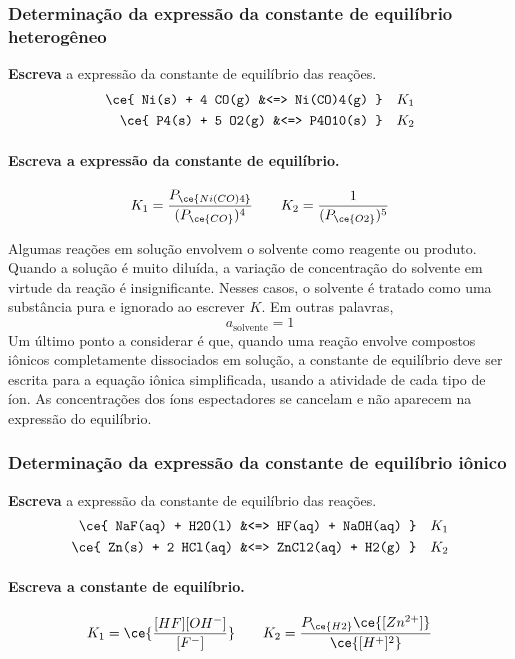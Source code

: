 \begin{example}

\subsubsection{Determinação da expressão da constante de equilíbrio heterogêneo}

\textbf{Escreva} a expressão da constante de equilíbrio das reações. \[
\begin{aligned}
    \ce{ Ni(s) + 4 CO(g) &<=> Ni(CO)4(g) } && K_1 \\
    \ce{ P4(s) + 5 O2(g) &<=> P4O10(s) }   && K_2
\end{aligned}
\]

\paragraph{Escreva a expressão da constante de equilíbrio.}

\[
    K_1 = \dfrac{ P_{\ce{Ni(CO)4}} }{ (P_{\ce{CO}})^4 } 
    \qquad
    K_2 = \dfrac{ 1 }{ (P_{\ce{O2}})^5 } 
\]

\end{example}

Algumas reações em solução envolvem o solvente como reagente ou produto. Quando a solução é muito diluída, a variação de concentração do solvente em
virtude da reação é insignificante. Nesses casos, o solvente é tratado como uma substância pura e ignorado ao escrever \(K\). Em outras palavras, \[
    a_\text{solvente} = 1
\] Um último ponto a considerar é que, quando uma reação envolve compostos iônicos completamente dissociados em solução, a constante de equilíbrio
deve ser escrita para a equação iônica simplificada, usando a atividade de cada tipo de íon. As concentrações dos íons espectadores se cancelam e não
aparecem na expressão do equilíbrio.

\begin{example}

\subsubsection{Determinação da expressão da constante de equilíbrio iônico}

\textbf{Escreva} a expressão da constante de equilíbrio das reações. \[
\begin{aligned}
    \ce{ NaF(aq) + H2O(l) &<=> HF(aq) + NaOH(aq)  } && K_1 \\
    \ce{ Zn(s) + 2 HCl(aq) &<=> ZnCl2(aq) + H2(g) } && K_2
\end{aligned}
\]

\paragraph{Escreva a constante de equilíbrio.}

\[
    K_1 = \ce{ \frac{ [HF] [OH^-] }{ [F^-] } }
    \qquad
    K_2 = \dfrac{ P_{\ce{H2}} \ce{[Zn^{2+}]} }{ \ce{[H^+]^2} }
\]

\end{example}

